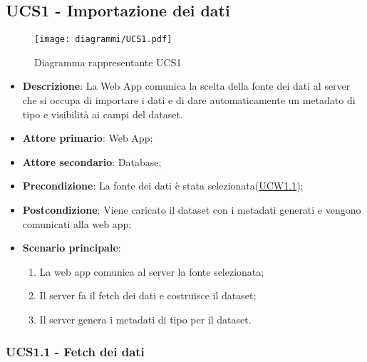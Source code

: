 \subsection{UCS1 - Importazione dei dati}
\label{sub:ucs1}


\begin{figure}[h]
	\centering
	\texttt{[image: diagrammi/UCS1.pdf]}
	\caption{Diagramma rappresentante UCS1}
	\label{fig:UCS1}
\end{figure}

\begin{itemize}
	\item \textbf{Descrizione}: La Web App comunica la scelta della fonte dei dati al server che si occupa di importare i dati e di dare automaticamente un metadato di tipo e visibilità ai campi del dataset.

	\item \textbf{Attore primario}: Web App;
	\item \textbf{Attore secondario}: Database;

	\item \textbf{Precondizione}:   La fonte dei dati è stata selezionata(\hyperref[ssub:ucw1.1]{UCW1.1});

	\item \textbf{Postcondizione}:  Viene caricato il dataset con i metadati generati e vengono comunicati alla web app;

	\item \textbf{Scenario principale}:
	      \begin{enumerate}
		      \item La web app comunica al server la fonte selezionata;
		      \item Il server fa il fetch dei dati e costruisce il dataset;
		      \item Il server genera i metadati di tipo per il dataset.
	      \end{enumerate}

\end{itemize}

\subsubsection{UCS1.1 - Fetch dei dati}
\label{ssub:ucs1.1}

